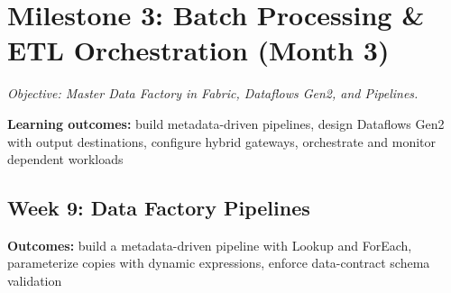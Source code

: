 \documentclass[11pt, a4paper]{article}
\begin{document}
\section{Milestone 3: Batch Processing \& ETL Orchestration (Month 3)}
\textit{Objective: Master Data Factory in Fabric, Dataflows Gen2, and Pipelines.}
\par\noindent\textbf{Learning outcomes:} build metadata-driven pipelines, design Dataflows Gen2 with output destinations, configure hybrid gateways, orchestrate and monitor dependent workloads

\subsection*{Week 9: Data Factory Pipelines}
\par\noindent\textbf{Outcomes:} build a metadata-driven pipeline with Lookup and ForEach, parameterize copies with dynamic expressions, enforce data-contract schema validation
\end{document}
